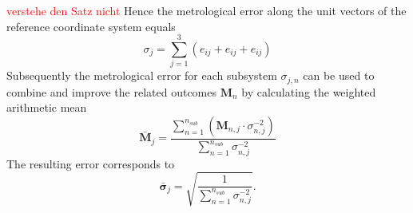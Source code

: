\documentclass[5p,times,procedia]{elsarticle}
\begin{document}
\textcolor{red}{verstehe den Satz nicht}
Hence the metrological error along the unit vectors of the reference coordinate system equals
\begin{equation}
	\sigma_j = \sum_{j=1}^{3} \left( e_{ij} + e_{ij} + e_{ij}\right)
\end{equation}
%
Subsequently the metrological error for each subsystem $\sigma_{j,n}$ can be used to combine and improve the related outcomes $\mathbf{M}_n$ by calculating the weighted arithmetic mean \cite{Price1972}
\begin{equation}
	\mathbf{\bar{M}}_{j} = \frac{\sum_{n=1}^{n_{sub}} \left( \mathbf{M}_{n,j} \cdot \sigma_{n,j}^{-2} \right)}{\sum_{n=1}^{n_{sub}} \sigma_{n,j}^{-2}}
\end{equation}
The resulting error corresponds to
\begin{equation}
	\mathbf{\bar{\sigma}}_{j} = \sqrt{ \frac{1}{\sum_{n=1}^{n_{sub}} \sigma_{n,j}^{-2}} }.
	\label{eqn:sum_noise}
\end{equation}
%
%
\end{document}
